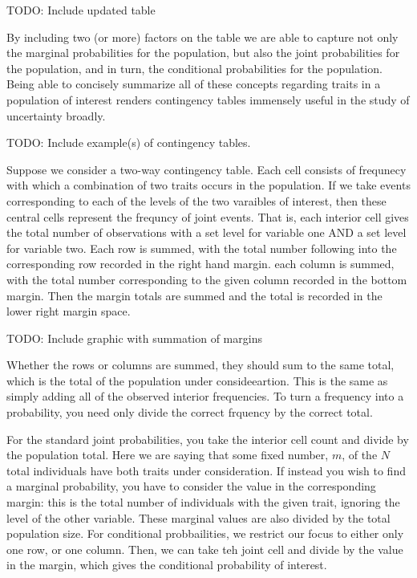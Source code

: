 \documentclass[
  letterpaper,
  DIV=11,
  numbers=noendperiod]{scrreprt}
\begin{document}
TODO: Include updated table

By including two (or more) factors on the table we are able to capture
not only the marginal probabilities for the population, but also the
joint probabilities for the population, and in turn, the conditional
probabilities for the population. Being able to concisely summarize all
of these concepts regarding traits in a population of interest renders
contingency tables immensely useful in the study of uncertainty broadly.

TODO: Include example(s) of contingency tables.

Suppose we consider a two-way contingency table. Each cell consists of
frequnecy with which a combination of two traits occurs in the
population. If we take events corresponding to each of the levels of the
two varaibles of interest, then these central cells represent the
frequncy of joint events. That is, each interior cell gives the total
number of observations with a set level for variable one AND a set level
for variable two. Each row is summed, with the total number following
into the corresponding row recorded in the right hand margin. each
column is summed, with the total number corresponding to the given
column recorded in the bottom margin. Then the margin totals are summed
and the total is recorded in the lower right margin space.

TODO: Include graphic with summation of margins

Whether the rows or columns are summed, they should sum to the same
total, which is the total of the population under consideeartion. This
is the same as simply adding all of the observed interior frequencies.
To turn a frequency into a probability, you need only divide the correct
frquency by the correct total.

For the standard joint probabilities, you take the interior cell count
and divide by the population total. Here we are saying that some fixed
number, \(m\), of the \(N\) total individuals have both traits under
consideration. If instead you wish to find a marginal probability, you
have to consider the value in the corresponding margin: this is the
total number of individuals with the given trait, ignoring the level of
the other variable. These marginal values are also divided by the total
population size. For conditional probbailities, we restrict our focus to
either only one row, or one column. Then, we can take teh joint cell and
divide by the value in the margin, which gives the conditional
probability of interest.
\end{document}
